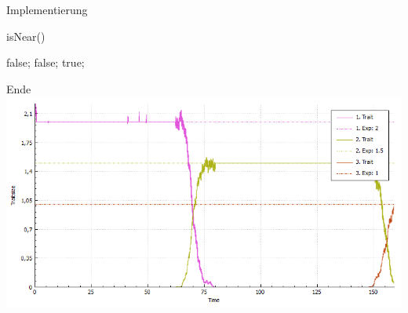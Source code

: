 \documentclass{beamer}
\begin{document}
\begin{frame}{Implementierung}
	\begin{algorithm}[H]
		\caption{isNear()}
		\begin{algorithmic}[1]
					\State \Return false;
				\EndIf
			\EndFor
				\State \Return false;
			\EndIf
			\State \Return true;
		\end{algorithmic}
	\end{algorithm}
\end{frame}

\begin{frame}{Ende}
\includegraphics[width=1\textwidth]{./Pictures/TSS2_optimierung_small_original}
\end{frame}
\end{document}

